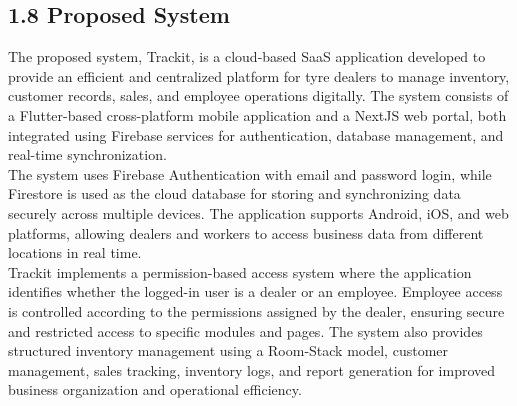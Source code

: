 \documentclass[12pt, oneside]{article}
\begin{document}
\subsection*{1.8 Proposed System}
The proposed system, Trackit, is a cloud-based SaaS application developed to provide an efficient and centralized platform for tyre dealers to manage inventory, customer records, sales, and employee operations digitally. The system consists of a Flutter-based cross-platform mobile application and a NextJS web portal, both integrated using Firebase services for authentication, database management, and real-time synchronization.\\[0.25 cm]
The system uses Firebase Authentication with email and password login, while Firestore \cite{firestore} is used as the cloud database for storing and synchronizing data securely across multiple devices. The application supports Android, iOS, and web platforms, allowing dealers and workers to access business data from different locations in real time.\\[0.25 cm]
Trackit implements a permission-based access system where the application identifies whether the logged-in user is a dealer or an employee. Employee access is controlled according to the permissions assigned by the dealer, ensuring secure and restricted access to specific modules and pages. The system also provides structured inventory management using a Room-Stack model, customer management, sales tracking, inventory logs, and report generation for improved business organization and operational efficiency.
\end{document}
